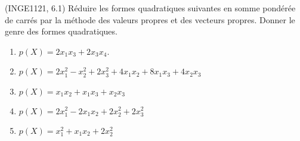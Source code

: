 

\begin{exercice}\label{exoINGE1121La0012}

	(INGE1121, 6.1)  Réduire les formes quadratiques suivantes en somme pondérée de carrés par la méthode des valeurs propres et des vecteurs propres. Donner le genre des formes quadratiques.
	\begin{enumerate}

		\item
			$p(X)=2x_1x_3+2x_3x_4$.
		\item
			$p(X)=2x_1^2-x_2^2+2x_3^2+4x_1x_2+8x_1x_3+4x_2x_3$
		\item
			$p(X)=x_1x_2+x_1x_3+x_2x_3$
		\item
			$p(X)=2x_1^2-2x_1x_2+2x_2^2+2x_3^2$
		\item
			$p(X)=x_1^2+x_1x_2+2x_2^2$

	\end{enumerate}

\end{exercice}
